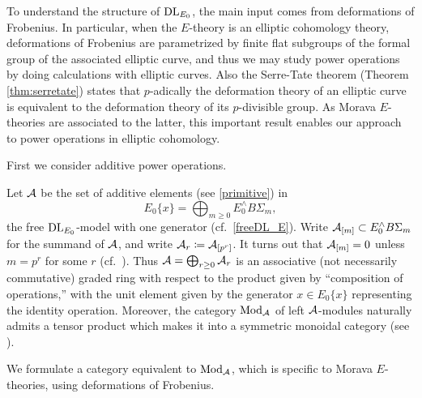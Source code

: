 \documentclass{gtpart}
\theoremstyle{definition}
\theoremstyle{remark}
\newcommand{\CA}{{\cal A}}
\newcommand{\Mod}{{\rm Mod}}
\newcommand{\dl}{{\rm DL}}
\newcommand{\ce}{\coloneqq}
\numberwithin{equation}{section}
\numberwithin{thm}{section}
\begin{document}
To understand the structure of $\dl_{E_0}$, the main input comes from 
deformations of Frobenius.  In particular, when the $E$-theory is an 
elliptic cohomology theory, deformations of Frobenius are parametrized 
by finite flat subgroups of the formal group of the associated elliptic 
curve, and thus we may study power operations by doing calculations with 
elliptic curves.  Also the Serre-Tate theorem (Theorem 
\ref{thm:serretate}) states that $p$-adically the deformation theory of 
an elliptic curve is equivalent to the deformation theory of its 
$p$-divisible group.  As Morava $E$-theories are associated to the 
latter, this important result enables our approach to power operations 
in elliptic cohomology.  

First we consider additive power operations.  

Let $\CA$ be the set of additive elements (see \eqref{primitive}) in 
\[
 E_0\{x\} = \bigoplus_{m \geq 0} E_0^\wedge B\Sigma_m, 
\]
the free $\dl_{E_0}$-model with one generator (cf.~\eqref{freeDL_E}).  
Write $\CA_{[m]} \subset E_0^\wedge B\Sigma_m$ for the summand of $\CA$, 
and write $\CA_r \ce \CA_{[p^r]}$.  It turns out that $\CA_{[m]} = 0$ 
unless $m = p^r$ for some $r$ (cf.~\cite[Lemma 8.10]{Str98}).  Thus 
$\CA = \bigoplus_{r \geq 0} \CA_r$ is an associative (not necessarily 
commutative) graded ring with respect to the product given by 
``composition of operations,'' with the unit element given by the 
generator $x \in E_0\{x\}$ representing the identity operation.  
Moreover, the category $\Mod_\CA$ of left $\CA$-modules naturally admits 
a tensor product which makes it into a symmetric monoidal category (see 
\cite[Proposition 7.6]{lpo}).  

We formulate a category equivalent to $\Mod_\CA$, which is specific to 
Morava $E$-theories, using deformations of Frobenius.  
\end{document}
